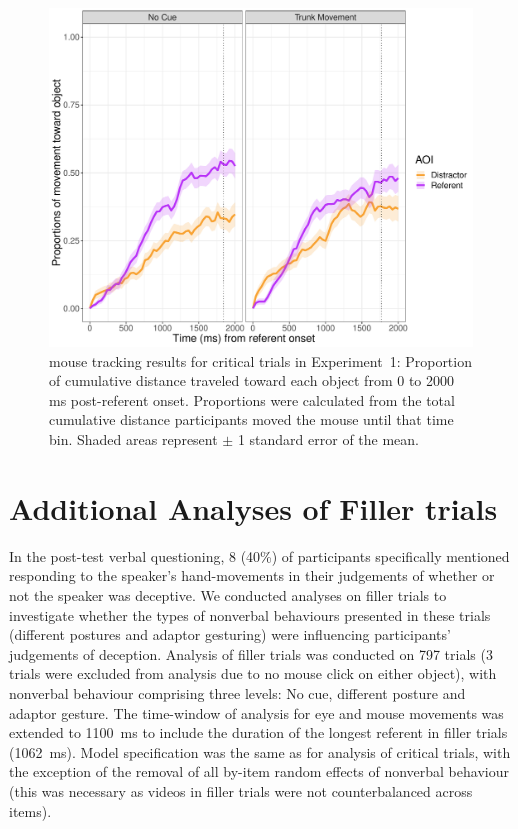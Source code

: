 \documentclass[a4paper,man,natbib]{apa6}
\begin{document}
\begin{figure}[Ht]
  \centering
	\includegraphics[width=\linewidth]{./img/e7_mouse_crit.pdf}
  \caption{mouse tracking results for critical trials in Experiment~1: Proportion of cumulative distance traveled toward each object from 0 to 2000 ms post-referent onset. Proportions were calculated from the total cumulative distance participants moved the mouse until that time bin. Shaded areas represent $\pm$ 1 standard error of the mean.}
  \label{fig:v1_mouse1}
\end{figure}

\section{Additional Analyses of Filler trials}
In the post-test verbal questioning, 8 (40\%) of participants specifically mentioned responding to the speaker's hand-movements in their judgements of whether or not the speaker was deceptive. 
We conducted analyses on filler trials to investigate whether the types of nonverbal behaviours presented in these trials (different postures and adaptor gesturing) were influencing participants' judgements of deception.
Analysis of filler trials was conducted on 797 trials (3 trials were excluded from analysis due to no mouse click on either object), with nonverbal behaviour comprising three levels: No cue, different posture and adaptor gesture. %
The time-window of analysis for eye  and mouse  movements was extended to 1100~ms to include the duration of the longest referent in filler trials (1062~ms).
Model specification was the same as for analysis of critical trials, with the exception of the removal of all by-item random effects of nonverbal behaviour (this was necessary as videos in filler trials were not counterbalanced across items).
\end{document}
